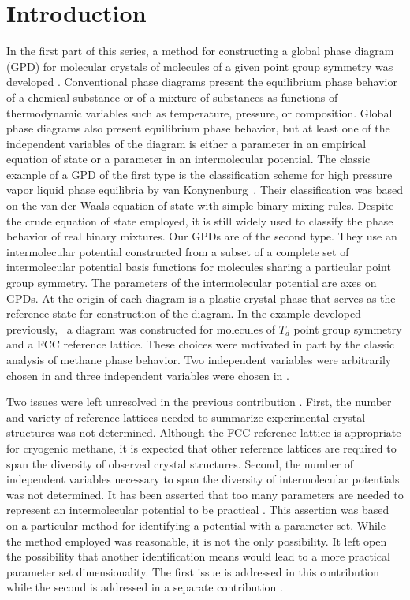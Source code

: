 \documentclass{iucr}              %
\begin{document}
\section{Introduction}

In the first part of this series, a method for constructing a global phase diagram (GPD) for molecular crystals of molecules of a given point group symmetry was developed \cite{Mettes04}.  Conventional phase diagrams present the equilibrium phase behavior of a chemical substance or of a mixture of substances as functions of thermodynamic variables such as temperature, pressure, or composition.  Global phase diagrams also present equilibrium phase behavior, but at least one of the independent variables of the diagram is either a parameter in an empirical equation of state or a parameter in an intermolecular potential.  The classic example of a GPD of the first type is the classification scheme for high pressure vapor liquid phase equilibria by van Konynenburg~\cite{VanKonynenburg80}. Their classification was based on the van der Waals equation of state with simple binary mixing rules. Despite the crude equation of state employed, it is still widely used to classify the phase behavior of real binary mixtures.  Our GPDs are of the second type. They use an intermolecular potential constructed from a subset of a complete set of intermolecular potential basis functions for molecules sharing a particular point group symmetry.  The parameters of the intermolecular potential are axes on GPDs.  At the origin of each diagram is a plastic crystal phase that serves as the reference state for construction of the diagram.  In the example developed previously,~\cite{Keith04c,Mettes04} a diagram was constructed for molecules of $T_d$ point group symmetry and a FCC reference lattice.  These choices were motivated in part by the classic analysis of methane phase behavior\cite{James59}.  Two independent variables were arbitrarily chosen in \cite{Keith04c} and three independent variables were chosen in \cite{Mettes04}.

Two issues were left unresolved in the previous contribution \cite{Mettes04}.  First, the number and variety of reference lattices needed to summarize experimental crystal structures was not determined.  Although the FCC reference lattice is appropriate for cryogenic methane, it is expected that other reference lattices are required to span the diversity of observed crystal structures.  Second, the number of independent variables necessary to span the diversity of intermolecular potentials was not determined.  It has been asserted that too many parameters are needed to represent an intermolecular potential to be practical \cite{Briels80}.  This assertion was based on a particular method for identifying a potential with a parameter set.  While the method employed was reasonable, it is not the only possibility.  It left open the possibility that another identification means would lead to a more practical parameter set dimensionality.  The first issue is addressed in this contribution while the second is addressed in a separate contribution \cite{Keith08}.
\end{document}
